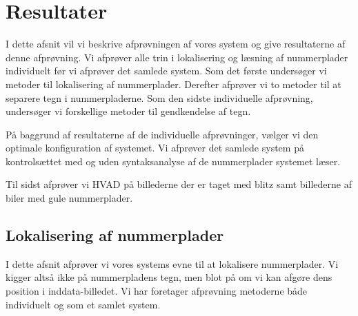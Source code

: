 \section{Resultater}
\label{sec:resultater}

I dette afsnit vil vi beskrive afprøvningen af vores system og give resultaterne af denne afprøvning. Vi afprøver alle trin i lokalisering og læsning af nummerplader individuelt før vi afprøver det samlede system. Som det første undersøger vi metoder til lokalisering af nummerplader. Derefter afprøver vi to metoder til at separere tegn i nummerpladerne. Som den sidste individuelle afprøvning, undersøger vi forskellige metoder til gendkendelse af tegn.

På baggrund af resultaterne af de individuelle afprøvninger, vælger vi den optimale konfiguration af systemet. Vi afprøver det samlede system på kontrolsættet med og uden syntaksanalyse af de nummerplader systemet læser.  

Til sidst afprøver vi HVAD på billederne der er taget med blitz samt billederne af biler med gule nummerplader.


\subsection{Lokalisering af nummerplader}
I dette afsnit afprøver vi vores systems evne til at lokalisere nummerplader. Vi kigger altså ikke på nummerpladens tegn, men blot på om vi kan afgøre dens position i inddata-billedet. Vi har foretager afprøvning metoderne både individuelt og som et samlet system.



